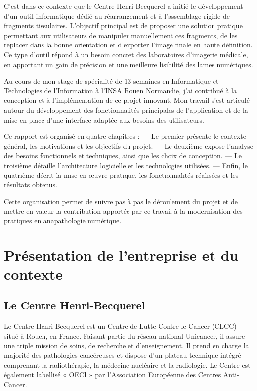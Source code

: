 \documentclass[11pt,a4paper]{report}
\begin{document}
C'est dans ce contexte que le Centre Henri Becquerel a initié le développement d'un outil informatique dédié au réarrangement et à l'assemblage rigide de fragments tissulaires. L'objectif principal est de proposer une solution pratique permettant aux utilisateurs de manipuler manuellement ces fragments, de les replacer dans la bonne orientation et d'exporter l'image finale en haute définition. Ce type d'outil répond à un besoin concret des laboratoires d'imagerie médicale, en apportant un gain de précision et une meilleure lisibilité des lames numériques.

Au cours de mon stage de spécialité de 13 semaines en Informatique et Technologies de l'Information à l'INSA Rouen Normandie, j'ai contribué à la conception et à l'implémentation de ce projet innovant. Mon travail s'est articulé autour du développement des fonctionnalités principales de l'application et de la mise en place d'une interface adaptée aux besoins des utilisateurs.

Ce rapport est organisé en quatre chapitres :
— Le premier présente le contexte général, les motivations et les objectifs du projet.
— Le deuxième expose l'analyse des besoins fonctionnels et techniques, ainsi que les choix de conception.
— Le troisième détaille l'architecture logicielle et les technologies utilisées.
— Enfin, le quatrième décrit la mise en œuvre pratique, les fonctionnalités réalisées et les résultats obtenus.

Cette organisation permet de suivre pas à pas le déroulement du projet et de mettre en valeur la contribution apportée par ce travail à la modernisation des pratiques en anapathologie numérique.

\chapter{Présentation de l'entreprise et du contexte}

\section{Le Centre Henri-Becquerel}

Le Centre Henri-Becquerel est un Centre de Lutte Contre le Cancer (CLCC) situé à Rouen, en France. Faisant partie du réseau national Unicancer, il assure une triple mission de soins, de recherche et d'enseignement. Il prend en charge la majorité des pathologies cancéreuses et dispose d'un plateau technique intégré comprenant la radiothérapie, la médecine nucléaire et la radiologie. Le Centre est également labellisé « OECI » par l'Association Européenne des Centres Anti-Cancer.
\end{document}
